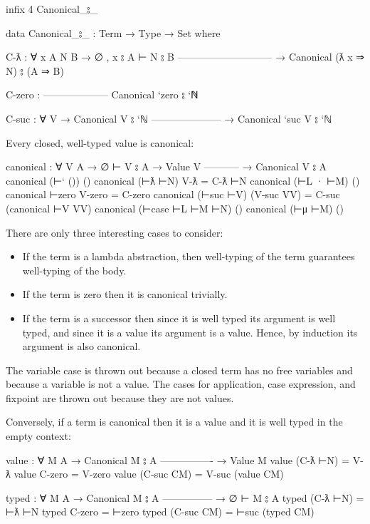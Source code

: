 \begin{fence}
\begin{code}
infix  4 Canonical_⦂_

data Canonical_⦂_ : Term → Type → Set where

  C-ƛ : ∀ {x A N B}
    → ∅ , x ⦂ A ⊢ N ⦂ B
      -----------------------------
    → Canonical (ƛ x ⇒ N) ⦂ (A ⇒ B)

  C-zero :
      --------------------
      Canonical `zero ⦂ `ℕ

  C-suc : ∀ {V}
    → Canonical V ⦂ `ℕ
      ---------------------
    → Canonical `suc V ⦂ `ℕ
\end{code}
\end{fence}

Every closed, well-typed value is canonical:

\begin{fence}
\begin{code}
canonical : ∀ {V A}
  → ∅ ⊢ V ⦂ A
  → Value V
    -----------
  → Canonical V ⦂ A
canonical (⊢` ())          ()
canonical (⊢ƛ ⊢N)          V-ƛ         =  C-ƛ ⊢N
canonical (⊢L · ⊢M)        ()
canonical ⊢zero            V-zero      =  C-zero
canonical (⊢suc ⊢V)        (V-suc VV)  =  C-suc (canonical ⊢V VV)
canonical (⊢case ⊢L ⊢M ⊢N) ()
canonical (⊢μ ⊢M)          ()
\end{code}
\end{fence}

There are only three interesting cases to consider:

\begin{itemize}
\item
  If the term is a lambda abstraction, then well-typing of the term
  guarantees well-typing of the body.
\item
  If the term is zero then it is canonical trivially.
\item
  If the term is a successor then since it is well typed its argument is
  well typed, and since it is a value its argument is a value. Hence, by
  induction its argument is also canonical.
\end{itemize}

The variable case is thrown out because a closed term has no free
variables and because a variable is not a value. The cases for
application, case expression, and fixpoint are thrown out because they
are not values.

Conversely, if a term is canonical then it is a value and it is well
typed in the empty context:

\begin{fence}
\begin{code}
value : ∀ {M A}
  → Canonical M ⦂ A
    ----------------
  → Value M
value (C-ƛ ⊢N)    =  V-ƛ
value C-zero      =  V-zero
value (C-suc CM)  =  V-suc (value CM)

typed : ∀ {M A}
  → Canonical M ⦂ A
    ---------------
  → ∅ ⊢ M ⦂ A
typed (C-ƛ ⊢N)    =  ⊢ƛ ⊢N
typed C-zero      =  ⊢zero
typed (C-suc CM)  =  ⊢suc (typed CM)
\end{code}
\end{fence}

